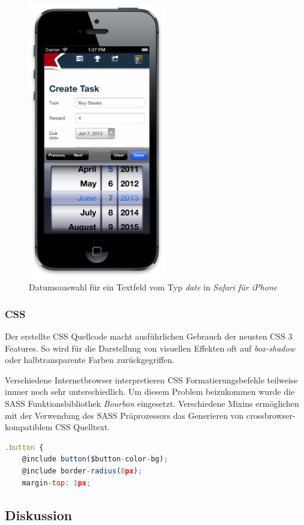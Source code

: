 \begin{figure}[H]
	\centering
	\includegraphics[width=6cm]{content/principle-demonstration/images/iossafari-datepicker.png}
	\caption{Datumsauswahl für ein Textfeld vom Typ \emph{date} in \emph{Safari für iPhone}}
	\label{fig:iossafari-datepicker}
\end{figure}


\subsubsection*{CSS}

Der erstellte CSS Quellcode macht ausführlichen Gebrauch der neusten CSS 3 Features. So wird für die Darstellung von visuellen Effekten oft auf \emph{box-shadow} oder halbtransparente Farben zurückgegriffen.

Verschiedene Internetbrowser interpretieren CSS Formatierungsbefehle teilweise immer noch sehr unterschiedlich. Um diesem Problem beizukommen wurde die SASS Funktionsbibliothek \emph{Bourbon} \cite{bourbon} eingesetzt. Verschiedene Mixins ermöglichen mit der Verwendung des SASS Präprozessors \cite{SASS} das Generieren von crossbrowser-kompatiblem CSS Quelltext.

\begin{lstlisting}[language=JavaScript, firstnumber=4, caption={Einbindung des \emph{@border-radius} Mixins von \emph{Bourbon} \cite{RoomiesSassBorderRadiusMixin}}, label={lst:roomiesSassBorderRadiusMixin}]
.button {
	@include button($button-color-bg);
	@include border-radius(8px);
	margin-top: 1px;
\end{lstlisting}




\subsection*{Diskussion}


